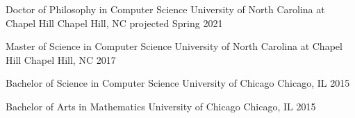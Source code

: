 
\begin{cventries}
  \cventry
    {Doctor of Philosophy in Computer Science} %
    {University of North Carolina at Chapel Hill} %
    {Chapel Hill, NC} %
    {projected Spring 2021} %
    {}

  \cventry
    {Master of Science in Computer Science} %
    {University of North Carolina at Chapel Hill} %
    {Chapel Hill, NC} %
    {2017} %
    {}

  \cventry
    {Bachelor of Science in Computer Science} %
    {University of Chicago} %
    {Chicago, IL} %
    {2015} %
    {}

  \cventry
    {Bachelor of Arts in Mathematics} %
    {University of Chicago} %
    {Chicago, IL} %
    {2015} %
    {}

\end{cventries}
